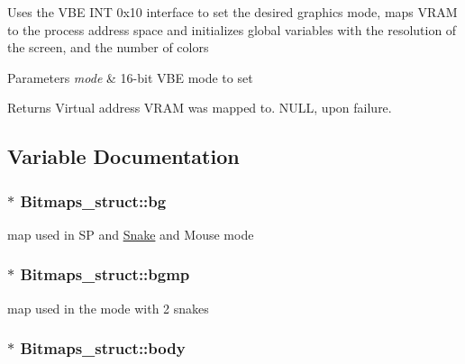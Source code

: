Uses the V\+BE I\+NT 0x10 interface to set the desired graphics mode, maps V\+R\+AM to the process\textquotesingle{} address space and initializes global variables with the resolution of the screen, and the number of colors


\begin{DoxyParams}{Parameters}
{\em mode} & 16-\/bit V\+BE mode to set \\
\hline
\end{DoxyParams}
\begin{DoxyReturn}{Returns}
Virtual address V\+R\+AM was mapped to. N\+U\+LL, upon failure. 
\end{DoxyReturn}


\subsection{Variable Documentation}
\subsubsection[{\texorpdfstring{bg}{bg}}]{$\ast$ Bitmaps\+\_\+struct\+::bg}\hypertarget{group__graphics_ga2b3fa0b4fba818dec225a5cfa4ad2400}{}\label{group__graphics_ga2b3fa0b4fba818dec225a5cfa4ad2400}


map used in SP and \hyperlink{structSnake}{Snake} and Mouse mode 

\subsubsection[{\texorpdfstring{bgmp}{bgmp}}]{$\ast$ Bitmaps\+\_\+struct\+::bgmp}\hypertarget{group__graphics_gaca55c5a5f1494cb6d6c872d072b501d1}{}\label{group__graphics_gaca55c5a5f1494cb6d6c872d072b501d1}


map used in the mode with 2 snakes 

\subsubsection[{\texorpdfstring{body}{body}}]{$\ast$ Bitmaps\+\_\+struct\+::body}\hypertarget{group__graphics_gaa22a993c184e8cd76dbdf4830e5d108e}{}\label{group__graphics_gaa22a993c184e8cd76dbdf4830e5d108e}


